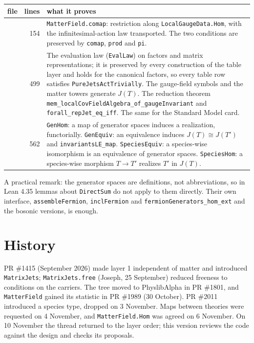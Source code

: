 \documentclass[11pt,a4paper]{article}
\newcommand{\lean}[1]{{\footnotesize\upshape\ttfamily\nolinkurl{#1}}}
\begin{document}
\begin{center}\small
\begin{tabular}{@{}>{\raggedright\arraybackslash}p{30mm}r>{\raggedright\arraybackslash}p{109mm}@{}}
\toprule
file & lines & what it proves \\
\midrule
\lean{MatterFields.lean} & 154 & \lean{MatterField.comap}: restriction along \lean{LocalGaugeData.Hom}, with the infinitesimal-action law transported. The two conditions are preserved by \lean{comap}, \lean{prod} and \lean{pi}. \\
\addlinespace[2pt]
\lean{Covariance.lean} & 499 & The evaluation law (\lean{EvalLaw}) on factors and matrix representations; it is preserved by every construction of the table layer and holds for the canonical factors, so every table row satisfies \lean{PureJetsActTrivially}. The gauge-field symbols and the matter towers generate $J(T)$. The reduction theorem \lean{mem_localCovFieldAlgebra_of_gaugeInvariant} and \lean{forall_repJet_eq_iff}. The same for the Standard Model card. \\
\addlinespace[2pt]
\lean{Morphisms.lean} & 562 & \lean{GenHom}: a map of generator spaces induces a realization, functorially. \lean{GenEquiv}: an equivalence induces $J(T)\cong J(T')$ and \lean{invariantsLE_map}. \lean{SpeciesEquiv}: a species-wise isomorphism is an equivalence of generator spaces. \lean{SpeciesHom}: a species-wise morphism $T\to T'$ realizes $T'$ in $J(T)$. \\
\bottomrule
\end{tabular}
\end{center}

A practical remark: the generator spaces are definitions, not abbreviations, so in Lean 4.35 lemmas about \lean{DirectSum} do not apply to them directly. Their own interface, \lean{assembleFermion}, \lean{inclFermion} and \lean{fermionGenerators_hom_ext} and the bosonic versions, is enough.

\section{History}

PR \#1415 (September 2026) made layer 1 independent of matter and introduced \lean{MatrixJets}; \lean{MatrixJets.free} (Joseph, 25 September) reduced freeness to conditions on the carriers. The tree moved to PhyslibAlpha in PR \#1801, and \lean{MatterField} gained its statistic in PR \#1989 (30 October). PR \#2011 introduced a species type, dropped on 3 November. Maps between theories were requested on 4 November, and \lean{MatterField.Hom} was agreed on 6 November. On 10 November the thread returned to the layer order; this version reviews the code against the design and checks its proposals.
\end{document}
